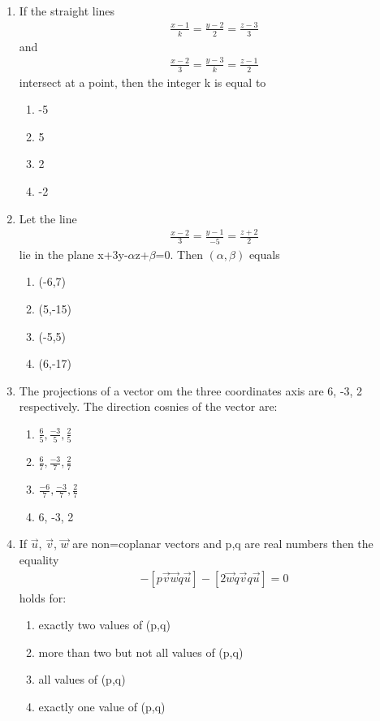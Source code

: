 \begin{enumerate}[label=\arabic*.,ref=\thesubsection.\theenumi]
\item If the straight lines 
\begin{align*}
\frac{x-1}{k}=\frac{y-2}{2}=\frac{z-3}{3}
\end{align*}
and 
\begin{align*}
\frac{x-2}{3}=\frac{y-3}{k}=\frac{z-1}{2}
\end{align*}
intersect at a point, then the integer k is equal to
\begin{enumerate}
\item -5
\item 5
\item 2
\item -2
\end{enumerate}

\item Let the line
\begin{align*}
\frac{x-2}{3}=\frac{y-1}{-5}=\frac{z+2}{2}
\end{align*}
lie in the plane x+3y-$\alpha$z+$\beta$=0. Then $(\alpha, \beta)$ equals
\begin{enumerate}
\item (-6,7)
\item (5,-15)
\item (-5,5)
\item (6,-17)
\end{enumerate}

\item The projections of a vector om the three coordinates axis are 6, -3, 2 respectively. The direction cosnies of the vector are:
\begin{enumerate}
\item $\frac{6}{5},\frac{-3}{5},\frac{2}{5}$
\item $\frac{6}{7},\frac{-3}{7},\frac{2}{7}$
\item $\frac{-6}{7},\frac{-3}{7},\frac{2}{7}$
\item 6, -3, 2
\end{enumerate}

\item If $\overrightarrow{u}$, $\overrightarrow{v}$, $\overrightarrow{w}$ are non=coplanar vectors and p,q are real numbers then the equality
\begin{align*}
[3\overrightarrow{u}p\overrightarrow{v}p\overrightarrow{w}]-[p\overrightarrow{v}\overrightarrow{w}q\overrightarrow{u}]-[2\overrightarrow{w}q\overrightarrow{v}q\overrightarrow{u}]=0
\end{align*}
holds for:
\begin{enumerate}
\item exactly two values of (p,q)
\item more than two but not all values of (p,q)
\item all values of (p,q)
\item exactly one value of (p,q)
\end{enumerate}


\end{enumerate}
